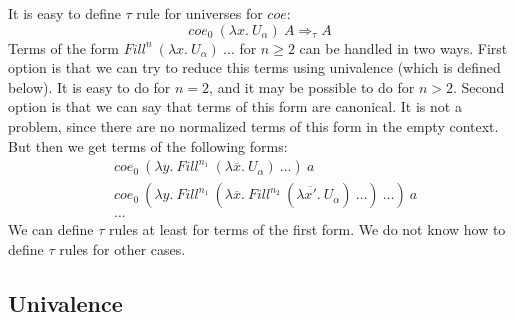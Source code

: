 \documentclass{amsart}
\theoremstyle{definition}
\theoremstyle{remark}
\newcommand{\red}{\Rightarrow}
\numberwithin{figure}{section}
\begin{document}
It is easy to define $\tau$ rule for universes for $coe$:
\[ coe_0\ (\lambda x.\ U_\alpha)\ A \red_\tau A \]
Terms of the form $Fill^n\ (\lambda x.\ U_\alpha)\ \ldots$ for $n \geq 2$ can be handled in two ways.
First option is that we can try to reduce this terms using univalence (which is defined below).
It is easy to do for $n = 2$, and it may be possible to do for $n > 2$.
Second option is that we can say that terms of this form are canonical.
It is not a problem, since there are no normalized terms of this form in the empty context.
But then we get terms of the following forms:
\begin{align*}
& coe_0\ (\lambda y.\ Fill^{n_1}\ (\lambda \overline{x}.\ U_\alpha)\ \ldots)\ a \\
& coe_0\ (\lambda y.\ Fill^{n_1}\ (\lambda \overline{x}.\ Fill^{n_2}\ (\lambda \overline{x'}.\ U_\alpha)\ \ldots)\ \ldots)\ a \\
& \ldots
\end{align*}
We can define $\tau$ rules at least for terms of the first form.
We do not know how to define $\tau$ rules for other cases.

\subsection{Univalence}
\end{document}
